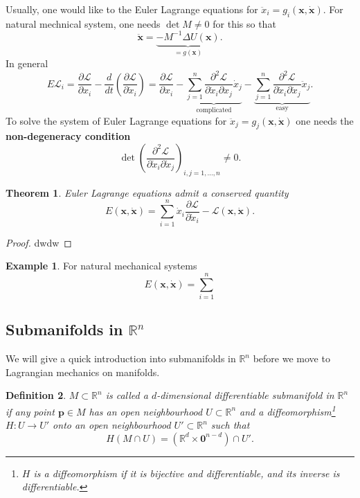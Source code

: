 \documentclass[hidelinks,a4paper, 11pt]{article}
\theoremstyle{plain}
\newtheorem{theorem}{Theorem}
\theoremstyle{break}
\theoremstyle{plain}
\newtheorem{definition}[theorem]{Definition}
\theoremstyle{definition}
\newtheorem*{example}{Example}
\begin{document}
{Usually, one would like to the Euler Lagrange equations for $\ddot x_i = g_i(\mathbf x, \mathbf{\dot x})$. For natural mechnical system, one needs $\det M \neq 0$ for this so that
\[
\mathbf{\ddot x} = \underbrace{-M^{-1}\Delta U(\mathbf x)}_{=g(\mathbf x)}.
\]
In general
\[
	E\mathcal L_i = \frac{\partial \mathcal L}{\partial x_i} - \frac{d}{dt}\left( \frac{\partial \mathcal L}{\partial \dot x_i} \right) = \frac{\partial \mathcal L}{\partial x_i} - \underbrace{\sum^n_{j=1}\frac{\partial^2 \mathcal L}{\partial \dot x_i \partial x_j}\dot x_j}_{\text{complicated}} - \underbrace{\sum^n_{j=1} \frac{\partial^2 \mathcal L}{\partial \dot x_i \partial \dot x_j}\ddot x_j}_{\text{easy}}.
\]
To solve the system of Euler Lagrange equations for $\ddot x_j = g_j(\mathbf x, \mathbf{\dot x})$ one needs the \textbf{non-degeneracy condition} $$\det(\frac{\partial^2 \mathcal L}{\partial \dot x_i \partial \dot x_j})_{i,j=1,...,n} \neq 0.$$

\begin{theorem}
	Euler Lagrange equations admit a conserved quantity
	\[
		E(\mathbf x, \mathbf{\dot x}) = \sum^n_{i=1}\dot x_i \frac{\partial \mathcal L}{\partial \dot x_i} - \mathcal L(\mathbf x, \mathbf{\dot x}).
	\]
\end{theorem}

\begin{proof}
	dwdw
\end{proof}

\begin{example}
	For natural mechanical systems
	\[
		E(\mathbf x, \mathbf{\dot x}) = \sum^n_{i=1}
	\]
\end{example}


\subsection{Submanifolds in $\mathbb R^n$}

We will give a quick introduction into submanifolds in $\mathbb R^n$ before we move to Lagrangian mechanics on manifolds.

\begin{definition}
	$M \subset \mathbb R^n$ is called a $d$-dimensional differentiable submanifold in $\mathbb R^n$ if any point $\mathbf p \in M$ has an open neighbourhood $U \subset \mathbb R^n$ and a diffeomorphism\footnote{$H$ is a diffeomorphism if it is bijective and differentiable, and its inverse is differentiable.} $H: U \to U'$ onto an open neighbourhood $U' \subset \mathbb R^n$ such that 
	\[
		H(M \cap U) = (\mathbb R^d \times \mathbf 0^{n- d}) \cap U'.
	\]
\end{definition}

}
\end{document}

